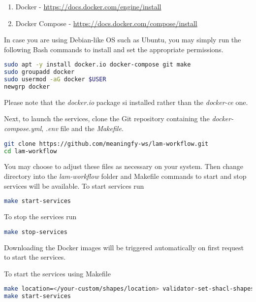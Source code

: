 \begin{enumerate}
	\item Docker - \url{https://docs.docker.com/engine/install}
	\item Docker Compose - \url{https://docs.docker.com/compose/install}
\end{enumerate}

In case you are using Debian-like OS such as Ubuntu, you may simply run the following Bash commands to install and set the appropriate permissions.

\begin{lstlisting}[language=bash,]
sudo apt -y install docker.io docker-compose git make
sudo groupadd docker
sudo usermod -aG docker $USER
newgrp docker
\end{lstlisting}

Please note that the \textit{docker.io} package si installed rather than the \textit{docker-ce} one.

Next, to launch the services, clone the Git repository containing the \textit{docker-compose.yml}, \textit{.env} file and the \textit{Makefile}. 

\begin{lstlisting}[language=bash,]
git clone https://github.com/meaningfy-ws/lam-workflow.git
cd lam-workflow
\end{lstlisting}

You may choose to adjust these files as necessary on your system. Then change directory into the \textit{lam-workflow} folder and Makefile commands to start and stop services will be available. To start services run

\begin{lstlisting}[language=bash,]
make start-services
\end{lstlisting}

To stop the services run 

\begin{lstlisting}[language=bash,]
make stop-services
\end{lstlisting}

Downloading the Docker images will be triggered automatically on first request to start the services.

To start the services using Makefile

\begin{lstlisting}[language=bash,]
make location=</your-custom/shapes/location> validator-set-shacl-shapes
make start-services
\end{lstlisting}

